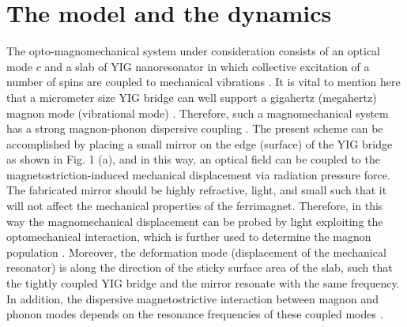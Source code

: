 \documentclass[aps,pra,superscriptaddress,balancelastpage,twocolumn]{revtex4}
\begin{document}
\section{The model and the dynamics}
The opto-magnomechanical system under consideration consists of an optical
mode $c$ and a slab of YIG nanoresonator in which collective excitation of a
number of spins are coupled to mechanical vibrations \cite{Heyroth}. It is
vital to mention here that a micrometer size YIG bridge can well support a
gigahertz (megahertz) magnon mode (vibrational mode) \cite{Heyroth}.
Therefore, such a magnomechanical system has a strong magnon-phonon
dispersive coupling \cite{disp2,mag,Kittel}. The present scheme can be
accomplished by placing a small mirror on the edge (surface) of the YIG
bridge as shown in Fig. 1 (a), and in this way, an optical field can be coupled
to the magnetostriction-induced mechanical displacement via radiation
pressure force. The fabricated mirror should be highly refractive, light,
and small such that it will not affect the mechanical
properties of the ferrimagnet. Therefore, in this way the
magnomechanical displacement can be probed by light
exploiting the optomechanical interaction, which is further
used to determine the magnon population \cite{ZRCS}. Moreover, the deformation mode (displacement of the mechanical
resonator) is along the direction of the sticky surface area of the slab,
such that the tightly coupled YIG bridge and the mirror resonate with the
same frequency. In addition, the dispersive magnetostrictive interaction
between magnon and phonon modes depends on the resonance frequencies of
these coupled modes \cite{Zha}.
\end{document}

